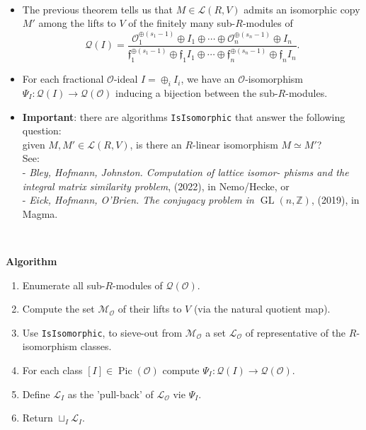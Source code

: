 \documentclass[aspectratio=169,usenames,dvipsnames]{beamer}
\def\Z{\mathbb{Z}}
\DeclareMathOperator{\Pic}{Pic}
\DeclareMathOperator{\GL}{GL}
\newcommand{\cO}{{\mathcal O}}
\newcommand{\cL}{{\mathcal L}}
\newcommand{\cM}{{\mathcal M}}
\newcommand{\cQ}{{\mathcal Q}}
\newcommand{\frf}{{\mathfrak f}}
\begin{document}
\begin{frame}{}\
   \begin{itemize}
      \item The previous theorem tells us that $M\in \cL(R,V)$ admits an isomorphic copy $M'$ among the lifts to $V$ of the finitely many sub-$R$-modules of 
      \[ \cQ(I) = \dfrac{\cO_1^{\oplus(s_1-1)}\oplus I_1\oplus\cdots\oplus\cO_n^{\oplus(s_n-1)}\oplus I_n}{\frf_1^{\oplus(s_1-1)}\oplus \frf_1I_1 \oplus \cdots \oplus\frf_n^{\oplus(s_n-1)}\oplus \frf_nI_n}. \]
      \pause
      \item For each fractional $\cO$-ideal $I=\oplus_i I_i$, we have an $\cO$-isomorphism $\Psi_I:\cQ(I)\to \cQ(\cO)$ inducing a bijection between the sub-$R$-modules.
      \pause
      \item {\bf Important}: there are algorithms \texttt{IsIsomorphic} that
      answer the following question:\\
      \pause given $M,M'\in\cL(R,V)$, is there an $R$-linear isomorphism $M\simeq M'$?\\
      See:\\
      - \emph{Bley, Hofmann, Johnston. Computation of lattice isomor-
      phisms and the integral matrix similarity problem}, (2022), in Nemo/Hecke, or\\
      - \emph{Eick, Hofmann, O'Brien. The conjugacy problem in
      $\GL(n, \Z)$}, (2019), in Magma. 
   \end{itemize}
\end{frame}

\begin{frame}{}\
   \begin{block}{\bf Algorithm}
      \begin{enumerate}
         \pause \item Enumerate all sub-$R$-modules of $\cQ(\cO)$.
         \pause \item Compute the set $\cM_\cO$ of their lifts to $V$ (via the natural quotient map).
         \pause \item Use \texttt{IsIsomorphic}, to sieve-out from $\cM_\cO$ a set $\cL_\cO$ of representative of the $R$-isomorphism classes.
         \pause \item For each class $[I] \in \Pic(\cO)$ compute $\Psi_I:\cQ(I)\to \cQ(\cO)$.
         \pause \item Define $\cL_I$ as the 'pull-back' of $\cL_\cO$ vie $\Psi_I$.
         \pause \item Return $\sqcup_I \cL_I$.
      \end{enumerate}
   \end{block}
\end{frame}
\end{document}
